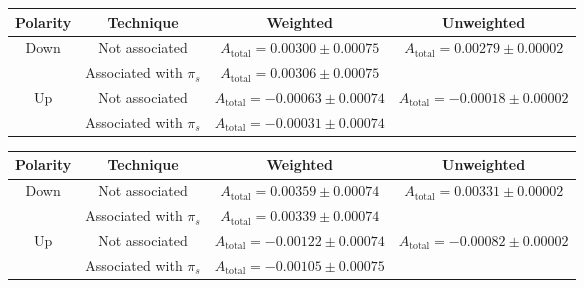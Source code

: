 \documentclass{article}
\begin{document}
        \begin{center}
                \begin{tabular}{c|c|c|c}
                        Polarity & Technique & Weighted & Unweighted\\
                        \hline\hline
                        \multirow{2}{*}{Down} & Not associated & $A_\text{total} = 0.00300 \pm 0.00075$ & \multirow{2}{*}{$A_\text{total} = 0.00279 \pm 0.00002$}\\
                        \cline{2-3}
                        & Associated with $\pi_s$ & $A_\text{total} = 0.00306 \pm 0.00075$ & \\
                        \hline
                        \multirow{2}{*}{Up} & Not associated & $A_\text{total} = - 0.00063 \pm 0.00074$ & \multirow{2}{*}{$A_\text{total} = - 0.00018 \pm 0.00002$}\\
                        \cline{2-3}
                        & Associated with $\pi_s$ & $A_\text{total} = - 0.00031 \pm 0.00074$ & \\
                \end{tabular}
                \label{tab:2015}
        \end{center}
        \begin{center}
                \begin{tabular}{c|c|c|c}
                        Polarity & Technique & Weighted & Unweighted\\
                        \hline\hline
                        \multirow{2}{*}{Down} & Not associated & $A_\text{total} = 0.00359 \pm 0.00074$ & \multirow{2}{*}{$A_\text{total} = 0.00331 \pm 0.00002$}\\
                        \cline{2-3}
                        & Associated with $\pi_s$ & $A_\text{total} = 0.00339 \pm 0.00074$ & \\
                        \hline
                        \multirow{2}{*}{Up} & Not associated & $A_\text{total} = - 0.00122 \pm 0.00074$ & \multirow{2}{*}{$A_\text{total} = - 0.00082 \pm 0.00002$}\\
                        \cline{2-3}
                        & Associated with $\pi_s$ & $A_\text{total} = - 0.00105 \pm 0.00075$ & \\
                \end{tabular}
                \label{tab:2016}
        \end{center}
\end{document}
